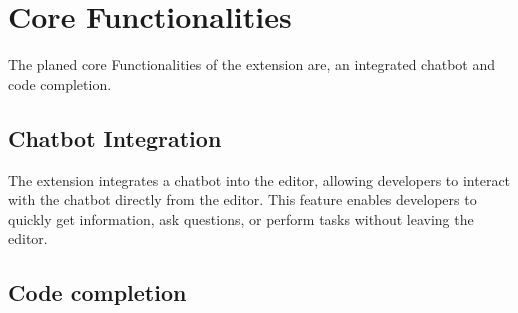 \section{Core Functionalities}
The planed core Functionalities of the extension are, an integrated chatbot and code completion. 
\subsection{Chatbot Integration}
The extension integrates a chatbot into the editor, allowing developers to interact with the chatbot directly from the editor. This feature enables developers to quickly get information, ask questions, or perform tasks without leaving the editor.
\subsection{Code completion}
